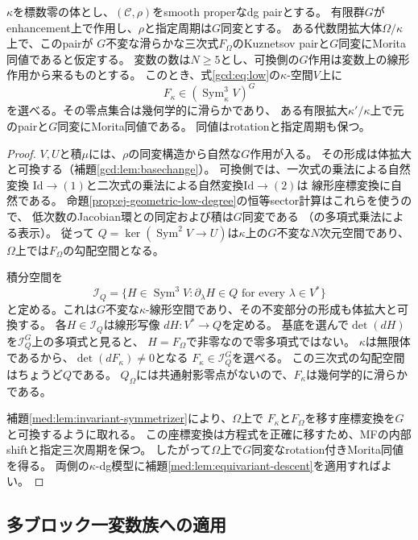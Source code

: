 \begin{proposition}[同変cubic模型の方程式降下]
\label{med:prop:equivariant-field-model}
$\kappa$を標数零の体とし、$(\mathcal C,\rho)$をsmooth properなdg pairとする。
有限群$G$がenhancement上で作用し、$\rho$と指定周期は$G$同変とする。
ある代数閉拡大体$\Omega/\kappa$上で、このpairが
$G$不変な滑らかな三次式$F_\Omega$のKuznetsov pairと$G$同変にMorita同値であると仮定する。
変数の数は$N\ge5$とし、可換側の$G$作用は変数上の線形作用から来るものとする。
このとき、式\eqref{gcd:eq:low}の$\kappa$-空間$V$上に
\[
 F_\kappa\in(\operatorname{Sym}^3_\kappa V)^G
\]
を選べる。その零点集合は幾何学的に滑らかであり、
ある有限拡大$\kappa'/\kappa$上で元のpairと$G$同変にMorita同値である。
同値はrotationと指定周期も保つ。
\end{proposition}
\begin{proof}
$V,U$と積$\mu$には、$\rho$の同変構造から自然な$G$作用が入る。
その形成は体拡大と可換する（補題\ref{gcd:lem:basechange}）。
可換側では、一次式の乗法による自然変換
$\mathrm{Id}\to(1)$と二次式の乗法による自然変換$\mathrm{Id}\to(2)$は
線形座標変換に自然である。
命題\ref{prop:ej-geometric-low-degree}の恒等sector計算はこれらを使うので、
低次数のJacobian環との同定および積は$G$同変である
（\cite[Theorem~3.5, Remark~3.6]{LZ}の多項式乗法による表示）。
従って
$Q=\ker(\operatorname{Sym}^2V\to U)$は$\kappa$上の$G$不変な$N$次元空間であり、
$\Omega$上では$F_\Omega$の勾配空間となる。

積分空間を
\[
 \mathcal I_Q=
 \{H\in\operatorname{Sym}^3V:\partial_\lambda H\in Q\text{ for every }\lambda\in V^*\}
\]
と定める。これは$G$不変な$\kappa$-線形空間であり、その不変部分の形成も体拡大と可換する。
各$H\in\mathcal I_Q$は線形写像
$dH:V^*\to Q$を定める。
基底を選んで$\det(dH)$を$\mathcal I_Q^G$上の多項式と見ると、
$H=F_\Omega$で非零なので零多項式ではない。
$\kappa$は無限体であるから、$\det(dF_\kappa)\ne0$となる
$F_\kappa\in\mathcal I_Q^G$を選べる。
この三次式の勾配空間はちょうど$Q$である。
$Q_\Omega$には共通射影零点がないので、$F_\kappa$は幾何学的に滑らかである。

補題\ref{med:lem:invariant-symmetrizer}により、$\Omega$上で
$F_\kappa$と$F_\Omega$を移す座標変換を$G$と可換するように取れる。
この座標変換は方程式を正確に移すため、MFの内部shiftと指定三次周期を保つ。
したがって$\Omega$上で$G$同変なrotation付きMorita同値を得る。
両側の$\kappa$-dg模型に補題\ref{med:lem:equivariant-descent}を適用すればよい。
\end{proof}

\subsection{多ブロック一変数族への適用}

